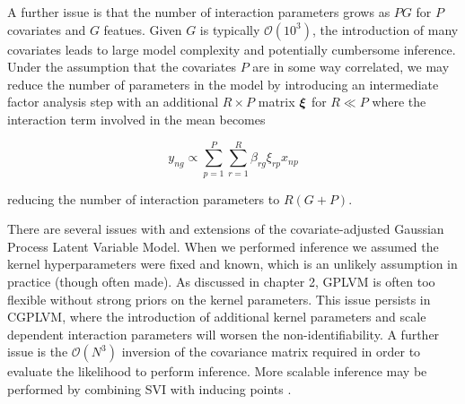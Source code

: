 A further issue is that the number of interaction parameters grows as $PG$ for $P$ covariates and $G$ featues. Given $G$ is typically $\mathcal{O}(10^3)$, the introduction of many covariates leads to large model complexity and potentially cumbersome inference. Under the assumption that the covariates $P$ are in some way correlated, we may reduce the number of parameters in the model by introducing an intermediate factor analysis step with an additional $R \times P$ matrix $\bm{\xi}$ for $R \ll P$ where the interaction term involved in the mean becomes

\begin{equation}
y_{ng} \propto \sum_{p=1}^{P} \sum_{r=1}^R \beta_{rg} \xi_{rp} x_{np}
\end{equation}

reducing the number of interaction parameters to $R(G + P)$.

There are several issues with and extensions of the covariate-adjusted Gaussian Process Latent Variable Model. When we performed inference we assumed the kernel hyperparameters were fixed and known, which is an unlikely assumption in practice (though often made). As discussed in chapter 2, GPLVM is often too flexible without strong priors on the kernel parameters. This issue persists in CGPLVM, where the introduction of additional kernel parameters and scale dependent interaction parameters will worsen the non-identifiability. A further issue is the $\mathcal{O}(N^3)$ inversion of the covariance matrix required in order to evaluate the likelihood to perform inference. More scalable inference may be performed by combining SVI with inducing points \cite{Titsias2010}.
